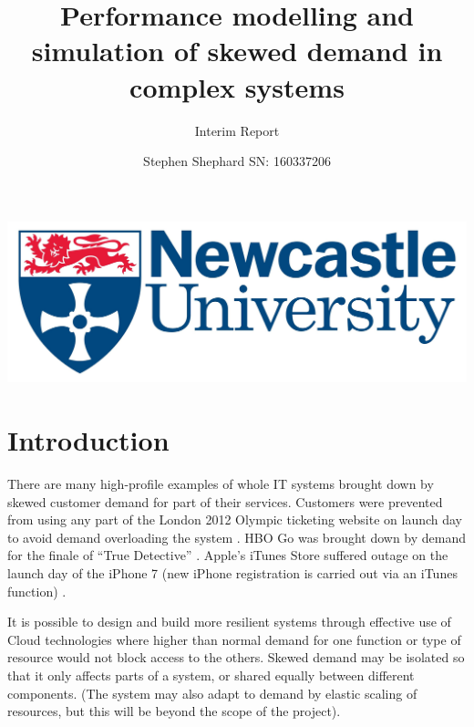 \documentclass{llncs}
\begin{document}
%
%
	
\title{Performance modelling and simulation of skewed demand in complex systems}
\subtitle{Interim Report}

\author{Stephen Shephard SN: 160337206}


\maketitle

\vspace*{\fill}
\begin{center}
\includegraphics[width=\textwidth]{img/ncllogo}
\end{center}
\newpage

%
%

\section{Introduction}

There are many high-profile examples of whole IT systems brought down by skewed customer demand for part of their services.  Customers were prevented from using any part of the London 2012 Olympic ticketing website on launch day to avoid demand overloading the system \cite{RN1067}.  HBO Go was brought down by demand for the finale of ``True Detective'' \cite{RN1066}.  Apple's iTunes Store suffered outage on the launch day of the iPhone 7 (new iPhone registration is carried out via an iTunes function) \cite{RN1068}.

It is possible to design and build more resilient systems through effective use of Cloud technologies where higher than normal demand for one function or type of resource would not block access to the others.  Skewed demand may be isolated so that it only affects parts of a system, or shared equally between different components. (The system may also adapt to demand by elastic scaling of resources, but this will be beyond the scope of the project).
\end{document}

